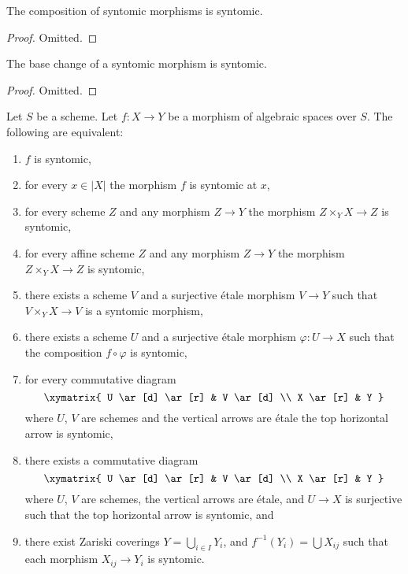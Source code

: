 \begin{lemma}
\label{lemma-composition-syntomic}
The composition of syntomic morphisms is syntomic.
\end{lemma}

\begin{proof}
Omitted.
\end{proof}

\begin{lemma}
\label{lemma-base-change-syntomic}
The base change of a syntomic morphism is syntomic.
\end{lemma}

\begin{proof}
Omitted.
\end{proof}

\begin{lemma}
\label{lemma-syntomic-local}
Let $S$ be a scheme.
Let $f : X \to Y$ be a morphism of algebraic spaces over $S$.
The following are equivalent:
\begin{enumerate}
\item $f$ is syntomic,
\item for every $x \in |X|$ the morphism $f$ is syntomic at $x$,
\item for every scheme $Z$ and any morphism $Z \to Y$ the morphism
$Z \times_Y X \to Z$ is syntomic,
\item for every affine scheme $Z$ and any morphism
$Z \to Y$ the morphism $Z \times_Y X \to Z$ is syntomic,
\item there exists a scheme $V$ and a surjective \'etale morphism
$V \to Y$ such that $V \times_Y X \to V$ is a syntomic morphism,
\item there exists a scheme $U$ and a surjective \'etale morphism
$\varphi : U \to X$ such that the composition $f \circ \varphi$
is syntomic,
\item for every commutative diagram
$$
\xymatrix{
U \ar[d] \ar[r] & V \ar[d] \\
X \ar[r] & Y
}
$$
where $U$, $V$ are schemes and the vertical arrows are \'etale
the top horizontal arrow is syntomic,
\item there exists a commutative diagram
$$
\xymatrix{
U \ar[d] \ar[r] & V \ar[d] \\
X \ar[r] & Y
}
$$
where $U$, $V$ are schemes, the vertical arrows are \'etale, and
$U \to X$ is surjective such that the top horizontal arrow is syntomic, and
\item there exist Zariski coverings $Y = \bigcup_{i \in I} Y_i$,
and $f^{-1}(Y_i) = \bigcup X_{ij}$ such that
each morphism $X_{ij} \to Y_i$ is syntomic.
\end{enumerate}
\end{lemma}

